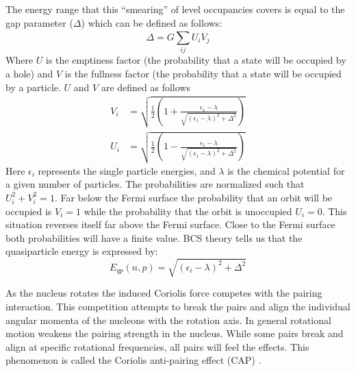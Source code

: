 The energy range that this ``smearing'' of level occupancies covers is equal to the gap parameter ($\Delta$) which can be defined as follows:
\begin{equation}
\label{eqn:chp2-pairing-gap-param}
\Delta = G\sum\limits_{ij}^{}U_iV_j
\end{equation}
Where $U$ is the emptiness factor (the probability that a state will be occupied by a hole) and $V$ is the fullness factor (the probability that a state will be occupied by a particle. $U$ and $V$ are defined as follows
\begin{align}
\label{eqn:chp2-pairing-gap-param-defs}
V_i &= \sqrt{\frac{1}{2}\left(1+\frac{\epsilon_1-\lambda}{\sqrt{(\epsilon_1-\lambda)^2+\Delta^2}}\right)}\\
U_i &= \sqrt{\frac{1}{2}\left(1-\frac{\epsilon_1-\lambda}{\sqrt{(\epsilon_1-\lambda)^2+\Delta^2}}\right)}
\end{align}
Here $\epsilon_i$ represents the single particle energies, and $\lambda$ is the chemical potential for a given number of particles. The probabilities are normalized such that $U_i^2+V_i^2=1$. Far below the Fermi surface the probability that an orbit will be occupied is $V_i=1$ while the probability that the orbit is unoccupied $U_i=0$. This situation reverses itself far above the Fermi surface. Close to the Fermi surface both probabilities will have a finite value. BCS theory \cite{bcsTheory} tells us that the quasiparticle energy is expressed by:
\begin{equation}
\label{eqn:chp2-pairing-qp-en}
E_{qp}(n,p)=\sqrt{(\epsilon_i-\lambda)^2+\Delta^2}
\end{equation}

As the nucleus rotates the induced Coriolis force competes with the pairing interaction. This competition attempts to break the pairs and align the individual angular momenta of the nucleons with the rotation axis. In general rotational motion weakens the pairing strength in the nucleus. While some pairs break and align at specific rotational frequencies, all pairs will feel the effects. This phenomenon is called the Coriolis anti-pairing effect (CAP) \cite{bohrMottelsonRotationWeakensPairing}.

